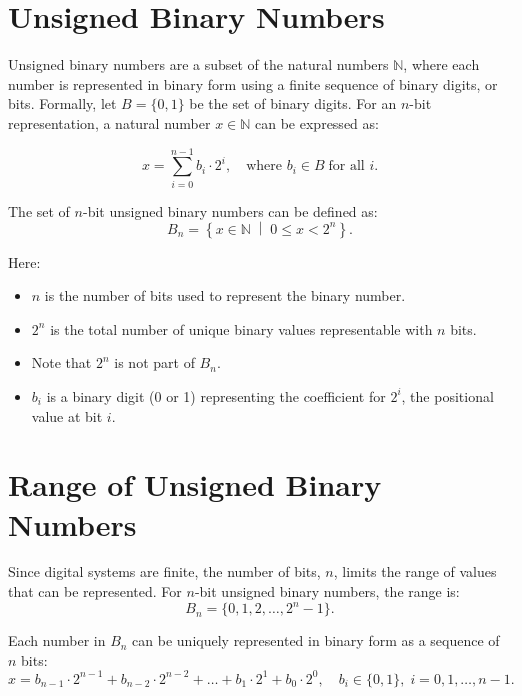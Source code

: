 \section{Unsigned Binary Numbers}
Unsigned binary numbers are a subset of the natural numbers \( \mathbb{N} \), where each number is represented in binary form using a finite sequence of binary digits, or bits. Formally, let \( B = \{0, 1\} \) be the set of binary digits. For an \( n \)-bit representation, a natural number \( x \in \mathbb{N} \) can be expressed as:

\[
x = \sum_{i=0}^{n-1} b_i \cdot 2^i, \quad \text{where } b_i \in B \; \text{for all } i.
\]

The set of \( n \)-bit unsigned binary numbers can be defined as:
\[
B_n = \left\{ x \in \mathbb{N} \; \middle| \; 0 \leq x < 2^n \right\}.
\]

Here:
\begin{itemize}
    \item \( n \) is the number of bits used to represent the binary number.
    \item \( 2^n \) is the total number of unique binary values representable with \( n \) bits.
    \item Note that \( 2^n \) is not part of \( B_n\).
    \item \( b_i \) is a binary digit (0 or 1) representing the coefficient for \( 2^i \), the positional value at bit \( i \).
\end{itemize}




\section{Range of Unsigned Binary Numbers}

Since digital systems are finite, the number of bits, \( n \), limits the range of values that can be represented. For \( n \)-bit unsigned binary numbers, the range is:
\[
B_n = \{0, 1, 2, \dots, 2^n - 1\}.
\]

Each number in \( B_n \) can be uniquely represented in binary form as a sequence of \( n \) bits:
\[
x = b_{n-1} \cdot 2^{n-1} + b_{n-2} \cdot 2^{n-2} + \dots + b_1 \cdot 2^1 + b_0 \cdot 2^0, \quad b_i \in \{0, 1\}, \; i = 0, 1, \dots, n-1.
\]

